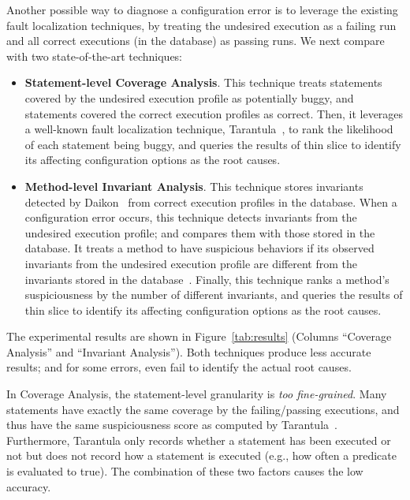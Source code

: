 

Another possible way to diagnose a configuration error is to leverage
the existing fault localization techniques, by treating the undesired
execution as a failing run and all correct executions (in the database)
as passing runs. We next compare \ourtool with two state-of-the-art
techniques: %

\begin{itemize}
\item \textbf{Statement-level Coverage Analysis}. This technique treats statements covered
by the undesired execution profile as potentially buggy, and statements
covered the correct execution profiles as correct.
Then, it leverages a well-known fault localization technique,
Tarantula~\cite{Jones:2002}, to rank the likelihood of each
statement being buggy, and queries the results of thin slice
to identify its affecting configuration options as the root causes.

\item \textbf{Method-level Invariant Analysis}. This technique stores invariants detected
by Daikon~\cite{Ernst:1999} from correct execution profiles in the database.
When a configuration error occurs, this technique detects invariants from the undesired execution profile;
and compares them with those stored in the database.
It treats a method to have suspicious behaviors if its observed invariants
from the undesired execution profile are different from the invariants stored
in the database~\cite{McCamant:2003}. Finally, this technique ranks a method's suspiciousness by
the number of different invariants, and queries the results of thin slice
to identify its affecting configuration options as the root causes. 
\end{itemize}


The experimental results are shown in Figure~\ref{tab:results} (Columns
``Coverage Analysis'' and ``Invariant Analysis'').
Both techniques produce less
accurate results; and for some errors, even fail to identify
the actual root causes.

In Coverage Analysis, the statement-level granularity is \textit{too fine-grained}.
Many statements have exactly the same coverage by the failing/passing executions,
and thus have the same suspiciousness score as computed by Tarantula~\cite{Jones:2002}.
Furthermore, Tarantula only records whether a
statement has been executed or not but does not record how a statement is 
executed (e.g., how often a predicate is evaluated to true). The combination
of these two factors causes the low accuracy.


